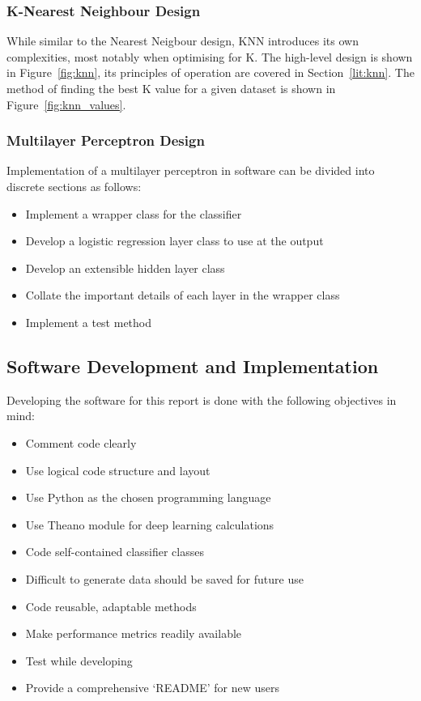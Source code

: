 \subsubsection{K-Nearest Neighbour Design}
While similar to the Nearest Neigbour design, 
KNN introduces its own complexities, most notably when optimising for K. The high-level design is shown in Figure~\ref{fig:knn}, its principles of operation are covered in Section~\ref{lit:knn}. The method of finding the best K value for a given dataset is shown in Figure~\ref{fig:knn_values}.




\subsubsection{Multilayer Perceptron Design}

Implementation of a multilayer perceptron in software can be divided into discrete sections as follows:
\begin{itemize}
	\item Implement a wrapper class for the classifier
	\item Develop a logistic regression layer class to use at the output
	\item Develop an extensible hidden layer class
	\item Collate the important details of each layer in the wrapper class
	\item Implement a test method
\end{itemize}


\subsection{Software Development and Implementation}

Developing the software for this report is done with the following objectives in mind:
\begin{itemize}
	\item Comment code clearly
	\item Use logical code structure and layout
	\item Use Python as the chosen programming language
	\item Use Theano module for deep learning calculations
	\item Code self-contained classifier classes
	\item Difficult to generate data should be saved for future use
	\item Code reusable, adaptable methods
	\item Make performance metrics readily available
	\item Test while developing
	\item Provide a comprehensive `README' for new users
\end{itemize}

